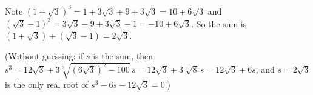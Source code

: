 Note $(1+\sqrt3)^3=1+3\sqrt3+9+3\sqrt3=10+6\sqrt3$ and $(\sqrt3-1)^3=3\sqrt3-9+3\sqrt3-1=-10+6\sqrt3$. So the sum is $(1+\sqrt3)+(\sqrt3-1)=\boxed{2\sqrt3}$.

(Without guessing: if $s$ is the sum, then $s^3=12\sqrt3+3\sqrt[3]{(6\sqrt3)^2-100}\,s=12\sqrt3+3\sqrt[3]{8}\,s=12\sqrt3+6s$, and $s=2\sqrt3$ is the only real root of $s^3-6s-12\sqrt3=0$.)

